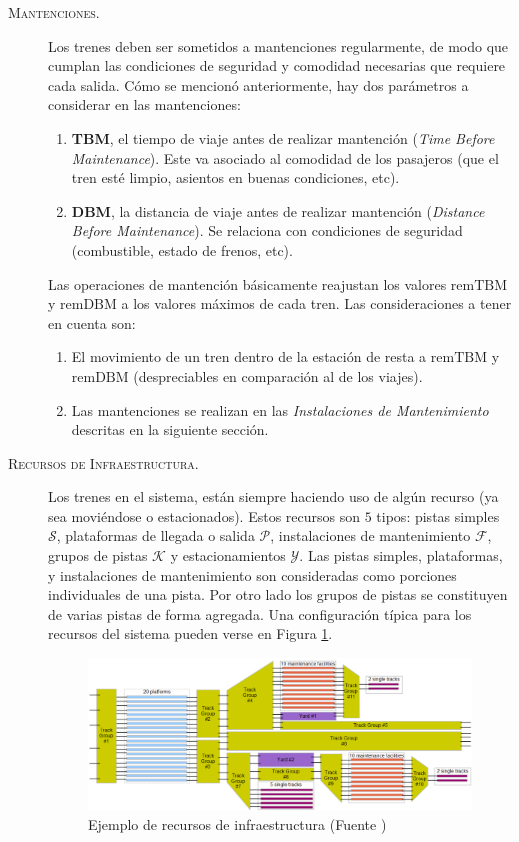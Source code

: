 \documentclass[letter, 10pt]{article}
\begin{document}
\begin{description}
    \item[\textsc{Mantenciones.}]
    Los trenes deben ser sometidos a mantenciones regularmente, de modo que cumplan las condiciones de seguridad y comodidad necesarias que requiere cada salida. Cómo se mencionó anteriormente, hay dos parámetros a considerar en las mantenciones:
    \begin{enumerate}
        \item \textbf{TBM}, el tiempo de viaje antes de realizar mantención (\textit{Time Before Maintenance}). Este va asociado al comodidad de los pasajeros (que el tren esté limpio, asientos en buenas condiciones, etc).
        \item \textbf{DBM}, la distancia de viaje antes de realizar mantención (\textit{Distance Before Maintenance}). Se
        relaciona con condiciones de seguridad (combustible, estado de frenos, etc).  
    \end{enumerate}
    Las operaciones de mantención básicamente reajustan los valores $\text{remTBM}$ y $\text{remDBM}$ a los valores máximos de cada tren. Las consideraciones a tener en cuenta son:
    \begin{enumerate}
        \item El movimiento de un tren dentro de la estación de resta a $\text{remTBM}$ y $\text{remDBM}$ (despreciables en comparación al de los viajes).
        \item Las mantenciones se realizan en las \textit{Instalaciones de Mantenimiento} descritas en la siguiente sección.
    \end{enumerate}

    \item[\textsc{Recursos de Infraestructura.}]
    Los trenes en el sistema, están siempre haciendo uso de algún recurso (ya sea moviéndose o estacionados). Estos recursos
    son $5$ tipos: pistas simples $\mathcal{S}$, plataformas de llegada o salida $\mathcal{P}$, instalaciones de mantenimiento $\mathcal{F}$, grupos de pistas $\mathcal{K}$ y estacionamientos $\mathcal{Y}$. Las pistas simples, plataformas, y instalaciones de mantenimiento son consideradas como porciones individuales de una pista. Por otro lado
    los grupos de pistas se constituyen de varias pistas de forma agregada. Una configuración típica para los recursos del
    sistema pueden verse en Figura \ref{fig:resources}.
     \begin{figure}[htpb!]
    \centering
    \includegraphics[width=12cm]{resources}
    \caption{Ejemplo de recursos de infraestructura (Fuente \cite{Problem})}
    \label{fig:resources}
    \end{figure}


\end{description}
\end{document}
